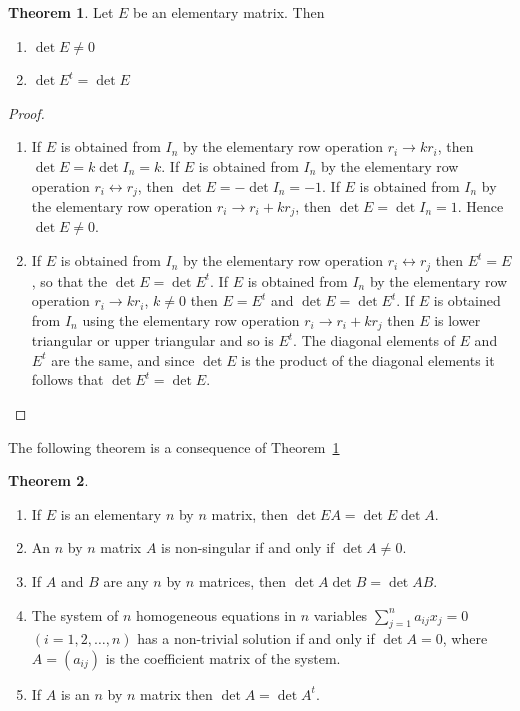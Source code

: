 \documentclass[11pt,a4paper]{article}
\theoremstyle{definition}
\newtheorem{thm}{Theorem}[subsection]
\begin{document}
\begin{thm}\label{thm:elementary-det}
Let $E$ be an elementary matrix. Then 
\begin{enumerate}
\item[i.] $\det E\neq 0$
\item[ii.] $\det E^t=\det E$
\end{enumerate}
\end{thm}


\begin{proof}
\begin{enumerate}
\item[i.] If $E$ is obtained from $I_n$ by the elementary row operation $r_i\longrightarrow kr_i$, then $\det E=k\det I_n=k$. If $E$ is obtained from $I_n$ by the elementary row operation $r_i\longleftrightarrow r_j$, then $\det E=-\det I_n=-1$. If $E$ is obtained from $I_n$ by the elementary row operation $r_i\longrightarrow r_i+kr_j$, then $\det E=\det I_n=1$. Hence $\det E\neq 0$.
\item[ii.] If $E$ is obtained from $I_n$ by the elementary row operation $r_i\longleftrightarrow r_j$ then $E^t=E$, so that the $\det E=\det E^t$. If $E$ is obtained from $I_n$ by the elementary row operation $r_i\longrightarrow kr_i$, $k\neq 0$ then $E=E^t$ and $\det E=\det E^t$. If $E$ is obtained from $I_n$ using the elementary row operation $r_i\longrightarrow r_i+kr_j$ then $E$ is lower triangular or upper triangular and so is $E^t$. The diagonal elements of $E$ and $E^t$ are the same, and since $\det E$ is the product of the diagonal elements it follows that $\det E^t=\det E$.
\end{enumerate}

\end{proof}
The following theorem is a consequence of Theorem~\ref{thm:elementary-det}

\begin{thm}
\begin{enumerate}
\item If $E$ is an elementary $n$ by $n$ matrix, then $\det EA=\det E\det A$.
\item An $n$ by $n$ matrix $A$ is non-singular if and only if $\det A\neq 0$.
\item If $A$ and $B$ are any $n$ by $n$ matrices, then $\det A\det B=\det AB$.
\item The system of $n$ homogeneous equations in $n$ variables
$\sum\limits_{j=1}^{n}a_{ij}x_j=0$ $(i=1,2,\dots,n)$ has a non-trivial solution
if and only if $\det A=0$, where $A=(a_{ij})$ is the coefficient matrix of the
system.
\item If $A$ is an $n$ by $n$ matrix then $\det A=\det A^t$.
\end{enumerate}
\end{thm}
\end{document}
